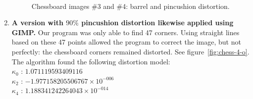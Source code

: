 \begin{enumerate}
\begin{figure}[H]
  \\
  \caption{Chessboard images \#3 and \#4: barrel and pincushion distortion.}
  \label{fig:chess-3-4}
\end{figure}
  \item \textbf{A version with $90\%$ pincushion distortion likewise applied using GIMP.} Our program was only able to find 47 corners. Using straight lines based on these 47 points allowed the program to correct the image, but not perfectly: the chessboard corners remained distorted. See figure~\ref{fig:chess-4-o}. The algorithm found the following distortion model:\\
   $ \kappa_{0}$ : $1.071119593409116$\\
   $ \kappa_{2}$ : $-1.977158205506767 \times 10^{-006}$\\
   $ \kappa_{4}$ : $1.188341242264043 \times 10^{-014}$\\

\end{enumerate}
